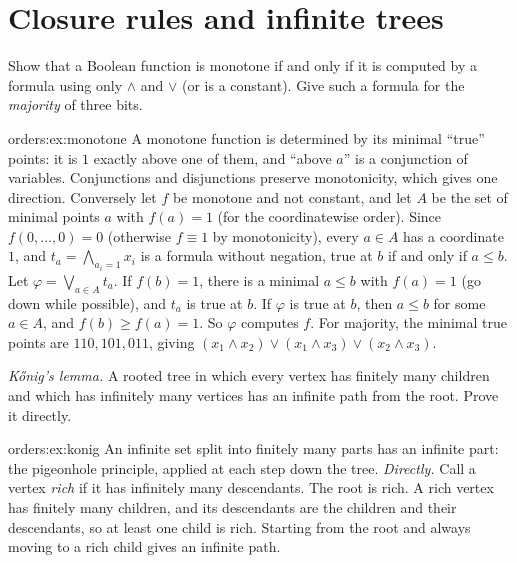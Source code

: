 \section{Closure rules and infinite trees}
\begin{exercise}[$\star\star$]\label{orders:ex:monotone}
Show that a Boolean function is monotone if and only if it is computed by a formula using only $\land$ and $\lor$ (or is a
constant). Give such a formula for the \emph{majority} of three bits.
\end{exercise}

\begin{solution}{orders:ex:monotone}
\idea A monotone function is determined by its minimal ``true'' points: it is $1$ exactly above one of them, and ``above $a$'' is
a conjunction of variables.
\writeup Conjunctions and disjunctions preserve monotonicity, which gives one direction. Conversely let $f$ be monotone and not constant, and let $A$ be the set of
minimal points $a$ with $f(a)=1$ (for the coordinatewise order). Since $f(0,\dots,0)=0$ (otherwise $f\equiv1$ by monotonicity), every
$a\in A$ has a coordinate $1$, and $t_a=\bigwedge_{a_i=1}x_i$ is a formula without negation, true at $b$ if and only if $a\le b$. Let
$\varphi=\bigvee_{a\in A}t_a$. If $f(b)=1$, there is a minimal $a\le b$ with $f(a)=1$ (go down while possible), and $t_a$ is true at $b$. If $\varphi$ is
true at $b$, then $a\le b$ for some $a\in A$, and $f(b)\ge f(a)=1$. So $\varphi$ computes $f$. For majority, the minimal true points are
$110,101,011$, giving $(x_1\land x_2)\lor(x_1\land x_3)\lor(x_2\land x_3)$.
\end{solution}

\begin{exercise}[$\star\star$]\label{orders:ex:konig}
\emph{K\H onig's lemma.} A rooted tree in which every vertex has finitely many children and which has infinitely many
vertices has an infinite path from the root. Prove it directly.
\end{exercise}

\begin{solution}{orders:ex:konig}
\idea An infinite set split into finitely many parts has an infinite part: the pigeonhole principle, applied at each step
down the tree.
\writeup \emph{Directly.} Call a vertex \emph{rich} if it has infinitely many descendants. The root is rich. A rich vertex has finitely
many children, and its descendants are the children and their descendants, so at least one child is rich. Starting
from the root and always moving to a rich child gives an infinite path.

\end{solution}

